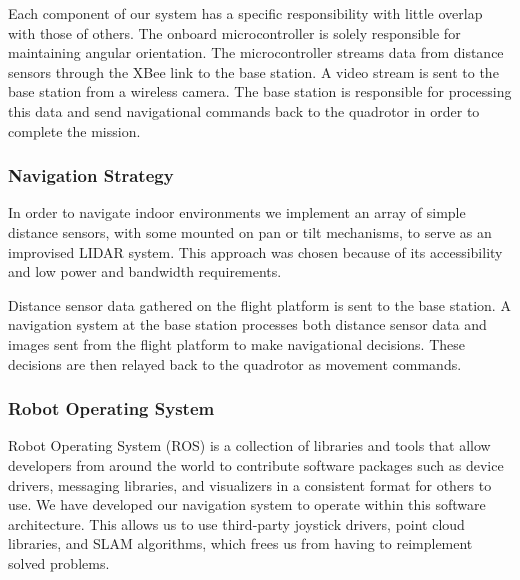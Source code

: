 \documentclass[12pt,letterpaper]{article}
\begin{document}
Each component of our system has a specific responsibility with little overlap
with those of others. The onboard microcontroller is solely responsible for
maintaining angular orientation. The microcontroller streams data from distance
sensors through the XBee link to the base station. A video stream is sent to
the base station from a wireless camera. The base station is responsible for
processing this data and send navigational commands back to the quadrotor in
order to complete the mission.


\subsubsection*{Navigation Strategy}

In order to navigate indoor environments we implement an array of simple
distance sensors, with some mounted on pan or tilt mechanisms, to serve as an
improvised LIDAR system. This approach was chosen because of its accessibility
and low power and bandwidth requirements.

Distance sensor data gathered on the flight platform is sent to the base
station. A navigation system at the base station processes both distance sensor
data and images sent from the flight platform to make navigational decisions.
These decisions are then relayed back to the quadrotor as movement commands.


\subsubsection*{Robot Operating System}

Robot Operating System (ROS) is a collection of libraries and tools that allow
developers from around the world to contribute software packages such as device
drivers, messaging libraries, and visualizers in a consistent format for others
to use. We have developed our navigation system to operate within this software
architecture. This allows us to use third-party joystick drivers, point cloud
libraries, and SLAM algorithms, which frees us from having to reimplement
solved problems.
\end{document}
